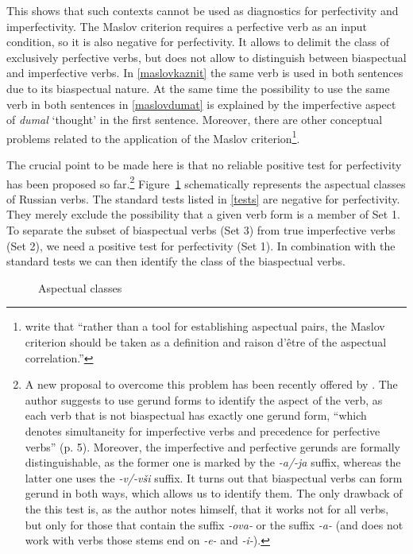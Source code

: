 This shows that such contexts cannot be used as diagnostics for perfectivity and imperfectivity. The Maslov criterion requires a perfective verb as an input condition, so it is also negative for perfectivity. It allows to delimit the class of exclusively perfective verbs, but does not allow to distinguish between biaspectual and imperfective verbs. In \ref{maslovkaznit} the same verb is used in both sentences due to its biaspectual nature. At the same time the possibility to use the same verb in both sentences in \ref{maslovdumat} is explained by the imperfective aspect of \textit{dumal} `thought' in the first sentence. Moreover, there are other conceptual problems related to the application of the Maslov criterion\footnote{\citet[2]{Mikaelian:07} write that ``rather than a tool for establishing aspectual pairs, the Maslov criterion should be taken as a definition and raison d'\^etre of the aspectual correlation.''}.

The crucial point to be made here is that no reliable positive test for perfectivity has been proposed so far.\footnote{A new proposal to overcome this problem has been recently offered by \citet{Piperski:biasp}. The author suggests to use gerund forms to identify the aspect of the verb, as each verb that is not biaspectual has exactly one gerund form, ``which denotes simultaneity for imperfective verbs and precedence for perfective verbs'' (p. 5). Moreover, the imperfective  and perfective gerunds are formally distinguishable, as the former one is marked by the \textit{-a/-ja} suffix, whereas the latter one uses the \textit{-v/-v\v{s}i} suffix. It turns out that biaspectual verbs can form gerund in both ways, which allows us to identify them. The only drawback of the this test is, as the author notes himself, that it works not for all verbs, but only for those that contain the suffix \textit{-ova-} or the suffix \textit{-a-} (and does not work with verbs those stems end on \textit{-e-} and \textit{-i-}).} Figure~\ref{circles} schematically represents the aspectual classes of Russian verbs. The standard tests listed in \ref{tests} are negative for perfectivity. They merely exclude the possibility that a given verb form is a member of Set 1. To separate the subset of biaspectual verbs (Set 3) from true imperfective verbs (Set 2), we need a positive test for perfectivity (Set 1). In combination with the standard tests we can then identify the class of the biaspectual verbs.

\begin{figure}
\caption{\label{circles}Aspectual classes}
\end{figure}

